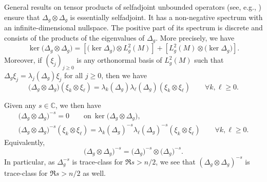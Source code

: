 \documentclass[10pt, a4paper]{amsart}
\newcommand{\C}{\mathbb{C}}
\numberwithin{equation}{section}
\theoremstyle{definition}
\theoremstyle{remark}
\begin{document}
General results on tensor products of selfadjoint unbounded operators (see, e.g., \cite[\S7.5]{Sc:Springer12}) ensure that  $ \Delta_g\otimes \Delta_g$ is essentially selfadjoint. It has a non-negative spectrum with an infinite-dimensional nullspace. The positive part of its spectrum is discrete and consists of the products of the eigenvalues of $\Delta_g$. More precisely, we have
\begin{equation*}
 \ker  \big( \Delta_g\otimes \Delta_g\big) = \left[\big(\ker \Delta_g\big)\otimes L^2_g(M)\right] +  \left[L^2_g(M)\otimes \big(\ker \Delta_g\big)\right].
\end{equation*}
Moreover, if  $(\xi_j)_{j\geq 0}$ is any orthonormal basis of $L_g^2(M)$ such that $\Delta_g \xi_j = \lambda_j(\Delta_g)\xi_j$ for all $j\geq 0$, then we have
\begin{equation*}
 \big( \Delta_g\otimes \Delta_g\big)(\xi_k\otimes \xi_\ell)= \lambda_k(\Delta_g) \lambda_\ell(\Delta_g)(\xi_k\otimes \xi_\ell) \qquad \forall k,\ell\geq 0.
\end{equation*}

Given any $s\in \C$, we then have
\begin{gather}
 \big( \Delta_g\otimes \Delta_g\big)^{-s}= 0 \qquad \text{on}\ \ker\big( \Delta_g\otimes \Delta_g\big),\label{eq:1st tensor product}\\
\big( \Delta_g\otimes \Delta_g\big)^{-s}(\xi_k\otimes \xi_\ell)= \lambda_k(\Delta_g)^{-s} \lambda_\ell(\Delta_g)^{-s} (\xi_k\otimes \xi_\ell) \qquad \forall k,\ell\geq 0.\label{eq:2nd tensor product}
\end{gather}
Equivalently,
\begin{equation}\label{eq:tensor identity}
 \big( \Delta_g\otimes \Delta_g\big)^{-s}=  \big( \Delta_g\big)^{-s}\otimes \big( \Delta_g\big)^{-s}.
\end{equation}
In particular, as $\Delta_g^{-s}$ is trace-class for $\Re s>n/2$, we see that $( \Delta_g\otimes \Delta_g)^{-s}$ is trace-class for $\Re s>n/2$ as well.
\end{document}
